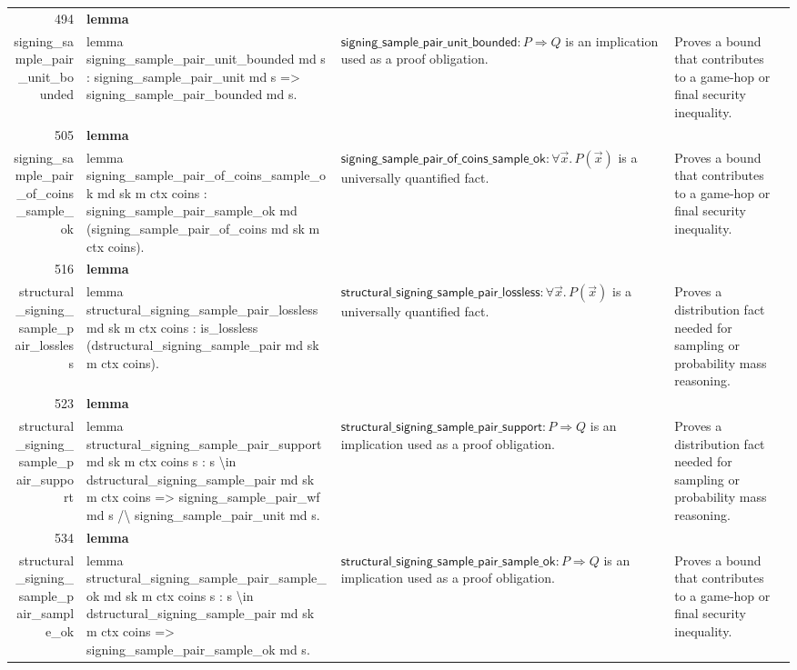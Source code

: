 \documentclass[10pt]{article}
\newcommand{\ec}[1]{\begingroup\ttfamily\scriptsize #1\endgroup}
\begin{document}
\begin{longtable}{r L{0.17\textwidth} L{0.26\textwidth} L{0.27\textwidth} L{0.20\textwidth}}
494 & \textbf{lemma}\\\ec{signing\_sample\_pair\_unit\_bounded} & \ec{lemma signing\_sample\_pair\_unit\_bounded md s : signing\_sample\_pair\_unit md s => signing\_sample\_pair\_bounded md s.} & \(\mathsf{signing\_sample\_pair\_unit\_bounded} : P \Rightarrow Q\) is an implication used as a proof obligation. & Proves a bound that contributes to a game-hop or final security inequality. \\
505 & \textbf{lemma}\\\ec{signing\_sample\_pair\_of\_coins\_sample\_ok} & \ec{lemma signing\_sample\_pair\_of\_coins\_sample\_ok md sk m ctx coins : signing\_sample\_pair\_sample\_ok md (signing\_sample\_pair\_of\_coins md sk m ctx coins).} & \(\mathsf{signing\_sample\_pair\_of\_coins\_sample\_ok} : \forall \vec{x}.\, P(\vec{x})\) is a universally quantified fact. & Proves a bound that contributes to a game-hop or final security inequality. \\
516 & \textbf{lemma}\\\ec{structural\_signing\_sample\_pair\_lossless} & \ec{lemma structural\_signing\_sample\_pair\_lossless md sk m ctx coins : is\_lossless (dstructural\_signing\_sample\_pair md sk m ctx coins).} & \(\mathsf{structural\_signing\_sample\_pair\_lossless} : \forall \vec{x}.\, P(\vec{x})\) is a universally quantified fact. & Proves a distribution fact needed for sampling or probability mass reasoning. \\
523 & \textbf{lemma}\\\ec{structural\_signing\_sample\_pair\_support} & \ec{lemma structural\_signing\_sample\_pair\_support md sk m ctx coins s : s \textbackslash{}in dstructural\_signing\_sample\_pair md sk m ctx coins => signing\_sample\_pair\_wf md s /\textbackslash{} signing\_sample\_pair\_unit md s.} & \(\mathsf{structural\_signing\_sample\_pair\_support} : P \Rightarrow Q\) is an implication used as a proof obligation. & Proves a distribution fact needed for sampling or probability mass reasoning. \\
534 & \textbf{lemma}\\\ec{structural\_signing\_sample\_pair\_sample\_ok} & \ec{lemma structural\_signing\_sample\_pair\_sample\_ok md sk m ctx coins s : s \textbackslash{}in dstructural\_signing\_sample\_pair md sk m ctx coins => signing\_sample\_pair\_sample\_ok md s.} & \(\mathsf{structural\_signing\_sample\_pair\_sample\_ok} : P \Rightarrow Q\) is an implication used as a proof obligation. & Proves a bound that contributes to a game-hop or final security inequality. \\

\end{longtable}
\end{document}
